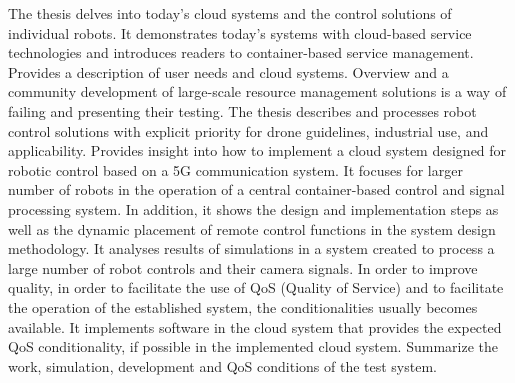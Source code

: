 The thesis delves into today’s cloud systems and the control solutions of individual robots.
It demonstrates today’s systems with cloud-based service technologies and introduces readers to container-based service management. Provides a description of user needs and cloud systems. Overview and a community development of large-scale resource management solutions is a way of failing and presenting their testing. The thesis describes and processes robot control solutions with explicit priority for drone guidelines, industrial use, and applicability. Provides insight into how to implement a cloud system designed for robotic control based on a 5G communication system. It focuses for larger number of robots in the operation of a central container-based control and signal processing system. In addition, it shows the design and implementation steps as well as the dynamic placement of remote control functions in the system design methodology. It analyses results of simulations in a system created to process a large number of robot controls and their camera signals. In order to improve quality, in order to facilitate the use of QoS (Quality of Service) and to facilitate the operation of the established system, the conditionalities usually becomes available. It implements software in the cloud system that provides the expected QoS conditionality, if possible in the implemented cloud system. Summarize the work, simulation, development and QoS conditions of the test system.

\vfill
\selectthesislanguage

\setcounter{romanPage}{\value{page}}
